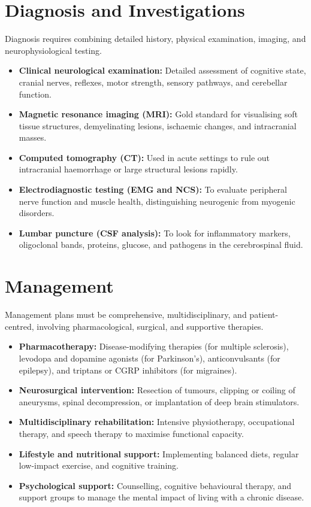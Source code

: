 \section*{Diagnosis and Investigations}
Diagnosis requires combining detailed history, physical examination, imaging, and neurophysiological testing.
\begin{itemize}
    \item \textbf{Clinical neurological examination:} Detailed assessment of cognitive state, cranial nerves, reflexes, motor strength, sensory pathways, and cerebellar function.
    \item \textbf{Magnetic resonance imaging (MRI):} Gold standard for visualising soft tissue structures, demyelinating lesions, ischaemic changes, and intracranial masses.
    \item \textbf{Computed tomography (CT):} Used in acute settings to rule out intracranial haemorrhage or large structural lesions rapidly.
    \item \textbf{Electrodiagnostic testing (EMG and NCS):} To evaluate peripheral nerve function and muscle health, distinguishing neurogenic from myogenic disorders.
    \item \textbf{Lumbar puncture (CSF analysis):} To look for inflammatory markers, oligoclonal bands, proteins, glucose, and pathogens in the cerebrospinal fluid.
\end{itemize}

\section*{Management}
Management plans must be comprehensive, multidisciplinary, and patient-centred, involving pharmacological, surgical, and supportive therapies.
\begin{itemize}
    \item \textbf{Pharmacotherapy:} Disease-modifying therapies (for multiple sclerosis), levodopa and dopamine agonists (for Parkinson's), anticonvulsants (for epilepsy), and triptans or CGRP inhibitors (for migraines).
    \item \textbf{Neurosurgical intervention:} Resection of tumours, clipping or coiling of aneurysms, spinal decompression, or implantation of deep brain stimulators.
    \item \textbf{Multidisciplinary rehabilitation:} Intensive physiotherapy, occupational therapy, and speech therapy to maximise functional capacity.
    \item \textbf{Lifestyle and nutritional support:} Implementing balanced diets, regular low-impact exercise, and cognitive training.
    \item \textbf{Psychological support:} Counselling, cognitive behavioural therapy, and support groups to manage the mental impact of living with a chronic disease.
\end{itemize}

